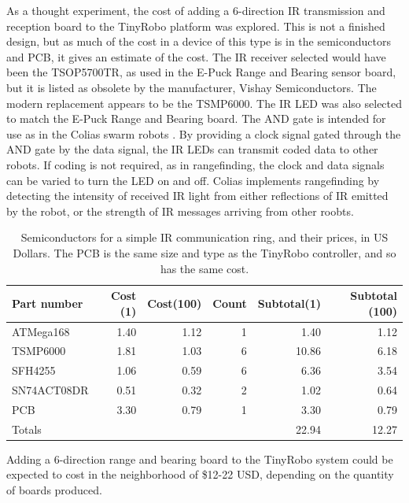 As a thought experiment, the cost of adding a 6-direction IR transmission and reception board to the TinyRobo platform was explored. 
This is not a finished design, but as much of the cost in a device of this type is in the semiconductors and PCB, it gives an estimate of the cost. 
The IR receiver selected would have been the TSOP5700TR, as used in the E-Puck Range and Bearing sensor board, but it is listed as obsolete by the manufacturer, Vishay Semiconductors. 
The modern replacement appears to be the TSMP6000.
The IR LED was also selected to match the E-Puck Range and Bearing board.
The AND gate is intended for use as in the Colias swarm robots \citep{arvin2009development}.
By providing a clock signal gated through the AND gate by the data signal, the IR LEDs can transmit coded data to other robots. 
If coding is not required, as in rangefinding, the clock and data signals can be varied to turn the LED on and off. 
Colias implements rangefinding by detecting the intensity of received IR light from either reflections of IR emitted by the robot, or the strength of IR messages arriving from other roobts. 

\begin{table}
	\begin{tabular}{l r r r r r }
		Part number & Cost (1) & Cost(100) & Count & Subtotal(1) & Subtotal (100)\\
		\hline 
		ATMega168 & 1.40 & 1.12 & 1 & 1.40 & 1.12  \\
		TSMP6000 & 1.81 & 1.03 & 6 & 10.86 & 6.18  \\
		SFH4255  & 1.06 & 0.59 & 6 & 6.36 & 3.54 \\
		SN74ACT08DR & 0.51 & 0.32 & 2 & 1.02 & 0.64 \\
		PCB & 3.30 & 0.79 & 1 & 3.30 & 0.79\\
		\hline 
		Totals & & & & 22.94 & 12.27\\
	\end{tabular}
	\caption{Semiconductors for a simple IR communication ring, and their prices, in US Dollars. The PCB is the same size and type as the TinyRobo controller, and so has the same cost.}
	\label{tab:ir_ranger_board}
\end{table}

Adding a 6-direction range and bearing board to the TinyRobo system could be expected to cost in the neighborhood of \$12-22 USD, depending on the quantity of boards produced. 


